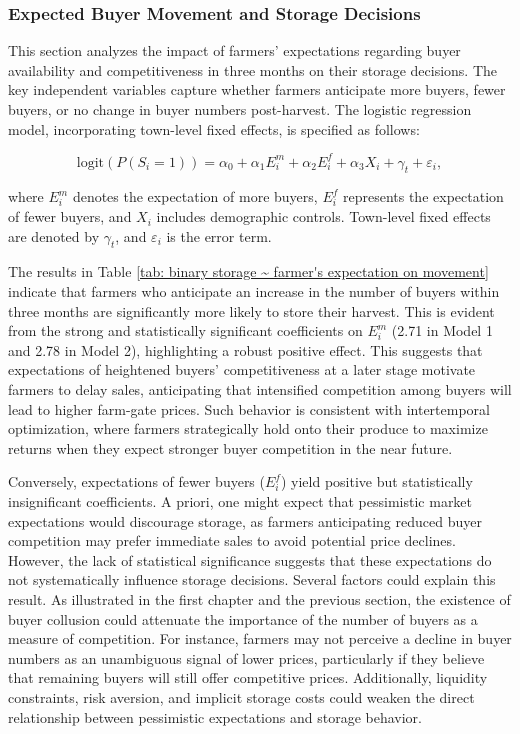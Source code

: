 \documentclass[12pt]{article}
\begin{document}
\subsubsection{Expected Buyer Movement and Storage Decisions}

\noindent This section analyzes the impact of farmers' expectations regarding buyer availability and competitiveness in three months on their storage decisions. The key independent variables capture whether farmers anticipate more buyers, fewer buyers, or no change in buyer numbers post-harvest. The logistic regression model, incorporating town-level fixed effects, is specified as follows:

\begin{equation}
    \text{logit} \left( P(S_i = 1) \right) = \alpha_0 + \alpha_1 E^m_i + \alpha_2 E^f_i + \alpha_3 X_i + \gamma_t + \varepsilon_i,
\end{equation}

where $E^m_i$ denotes the expectation of more buyers, $E^f_i$ represents the expectation of fewer buyers, and $X_i$ includes demographic controls. Town-level fixed effects are denoted by $\gamma_t$, and $\varepsilon_i$ is the error term.



The results in Table \ref{tab: binary storage ~ farmer's expectation on movement} indicate that farmers who anticipate an increase in the number of buyers within three months are significantly more likely to store their harvest. This is evident from the strong and statistically significant coefficients on $E^m_i$ (2.71 in Model 1 and 2.78 in Model 2), highlighting a robust positive effect. This suggests that expectations of heightened buyers' competitiveness at a later stage motivate farmers to delay sales, anticipating that intensified competition among buyers will lead to higher farm-gate prices. Such behavior is consistent with intertemporal optimization, where farmers strategically hold onto their produce to maximize returns when they expect stronger buyer competition in the near future.  

Conversely, expectations of fewer buyers ($E^f_i$) yield positive but statistically insignificant coefficients. A priori, one might expect that pessimistic market expectations would discourage storage, as farmers anticipating reduced buyer competition may prefer immediate sales to avoid potential price declines. However, the lack of statistical significance suggests that these expectations do not systematically influence storage decisions. Several factors could explain this result. As illustrated in the first chapter and the previous section, the existence of buyer collusion could attenuate the importance of the number of buyers as a measure of competition. For instance, farmers may not perceive a decline in buyer numbers as an unambiguous signal of lower prices, particularly if they believe that remaining buyers will still offer competitive prices. Additionally, liquidity constraints, risk aversion, and implicit storage costs could weaken the direct relationship between pessimistic expectations and storage behavior.  
\end{document}
